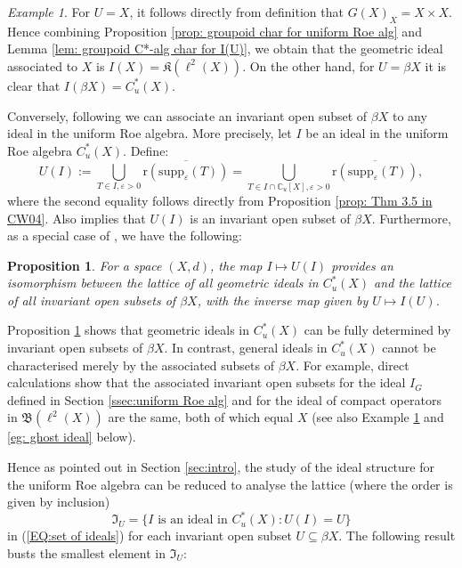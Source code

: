 \documentclass[12pt, a4paper]{amsart}
\numberwithin{equation}{section}
\newtheorem{prop}[thm]{Proposition}
\theoremstyle{definition}
\theoremstyle{remark}
\newtheorem{ex}[thm]{Example}
\def\CC{\mathbb{C}}
\def\B{\mathfrak{B}}
\def\K{\mathfrak{K}}
\def\supp{\mathrm{supp}}
\def\r{\mathrm{r}}
\begin{document}
\begin{ex}\label{eg: compact ideal}
For $U=X$, it follows directly from definition that $G(X)_X = X \times X$. Hence combining Proposition \ref{prop: groupoid char for uniform Roe alg} and Lemma \ref{lem: groupoid C*-alg char for I(U)}, we obtain that the geometric ideal associated to $X$ is $I(X)=\K(\ell^2(X))$. On the other hand, for $U=\beta X$ it is clear that $I(\beta X) = C^*_u(X)$.
\end{ex}


Conversely, following \cite[Section 4 and 5]{CW04} we can associate an invariant open subset of $\beta X$ to any ideal in the uniform Roe algebra. More precisely, let $I$ be an ideal in the uniform Roe algebra $C^*_u(X)$. Define:
\begin{equation}\label{EQ: defn for U(I)}
U(I) :=\bigcup_{T \in I, \varepsilon >0} \overline{\r(\supp_\varepsilon(T))} = \bigcup_{T \in I \cap \CC_u[X], \varepsilon >0} \overline{\r(\supp_\varepsilon(T))},
\end{equation}
where the second equality follows directly from Proposition \ref{prop: Thm 3.5 in CW04}. Also \cite[Lemma 5.2]{CW04} implies that $U(I)$ is an invariant open subset of $\beta X$. Furthermore, as a special case of \cite[Theorem 6.3]{CW04}, we have the following:

\begin{prop}\label{prop: 1-1 btw ideals and open inv subsets}
For a space $(X,d)$, the map $I \mapsto U(I)$ provides an isomorphism between the lattice of all geometric ideals in $C^*_u(X)$ and the lattice of all invariant open subsets of $\beta X$, with the inverse map given by $U \mapsto I(U)$.
\end{prop}

Proposition \ref{prop: 1-1 btw ideals and open inv subsets} shows that geometric ideals in $C^*_u(X)$ can be fully determined by invariant open subsets of $\beta X$. In contrast, general ideals in $C^*_u(X)$ cannot be characterised merely by the associated subsets of $\beta X$. For example, direct calculations show that the associated invariant open subsets for the ideal $I_G$ defined in Section \ref{ssec:uniform Roe alg} and for the ideal of compact operators in $\B(\ell^2(X))$ are the same, both of which equal $X$ (see also Example \ref{eg: compact ideal} and \ref{eg: ghost ideal} below).


Hence as pointed out in Section \ref{sec:intro}, the study of the ideal structure for the uniform Roe algebra can be reduced to analyse the lattice (where the order is given by inclusion)
\[
\mathfrak{I}_U=\{I \mbox{~is~an~ideal~in~} C^*_u(X): U(I)=U\}
\]
in (\ref{EQ:set of ideals}) for each invariant open subset $U \subseteq \beta X$. The following result busts the smallest element in $\mathfrak{I}_U$:
\end{document}
